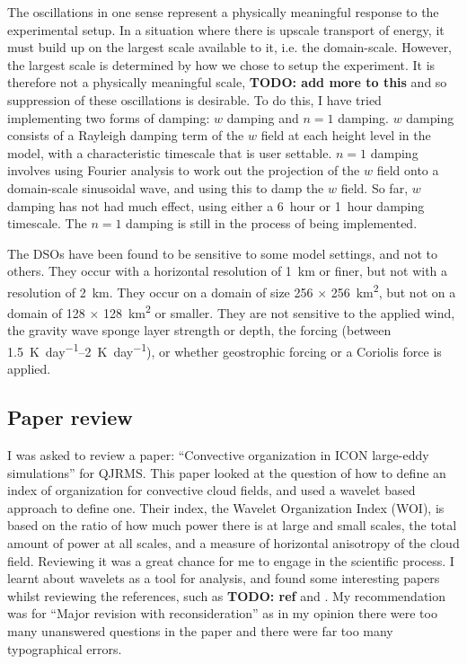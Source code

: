 \documentclass[11pt,a4paper]{article}
\newcommand\todo[1]{\textbf{TODO: #1}}
\newcommand\dom[1]{\si{#1} $\times$ \SI{#1}{km^2}}
\begin{document}
The oscillations in one sense represent a physically meaningful response to the experimental setup. In a situation where there is upscale transport of energy, it must build up on the largest scale available to it, i.e. the domain-scale. However, the largest scale is determined by how we chose to setup the experiment. It is therefore not a physically meaningful scale, \todo{add more to this} and so suppression of these oscillations is desirable. To do this, I have tried implementing two forms of damping: $w$ damping and $n = 1$ damping. $w$ damping consists of a Rayleigh damping term of the $w$ field at each height level in the model, with a characteristic timescale that is user settable. $n = 1$ damping involves using Fourier analysis to work out the projection of the $w$ field onto a domain-scale sinusoidal wave, and using this to damp the $w$ field. So far, $w$ damping has not had much effect, using either a \SI{6}{hour} or \SI{1}{hour} damping timescale. The $n = 1$ damping is still in the process of being implemented.

The DSOs have been found to be sensitive to some model settings, and not to others. They occur with a horizontal resolution of \SI{1}{km} or finer, but not with a resolution of \SI{2}{km}. They occur on a domain of size \dom{256}, but not on a domain of \dom{128} or smaller. They are not sensitive to the applied wind, the gravity wave sponge layer strength or depth, the forcing (between \SIrange{1.5}{2}{K.day^{-1}}), or whether geostrophic forcing or a Coriolis force is applied.

\subsection{Paper review}

I was asked to review a paper: ``Convective organization in ICON large-eddy simulations'' for QJRMS. This paper looked at the question of how to define an index of organization for convective cloud fields, and used a wavelet based approach to define one. Their index, the Wavelet Organization Index (WOI), is based on the ratio of how much power there is at large and small scales, the total amount of power at all scales, and a measure of horizontal anisotropy of the cloud field. Reviewing it was a great chance for me to engage in the scientific process. I learnt about wavelets as a tool for analysis, and found some interesting papers whilst reviewing the references, such as \todo{ref} \cite{weniger2017} and \cite{wong2016}. My recommendation was for ``Major revision with reconsideration'' as in my opinion there were too many unanswered questions in the paper and there were far too many typographical errors.
\end{document}
